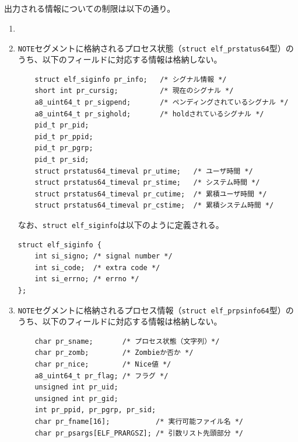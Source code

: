 \documentclass[twoside,11pt,fleqn]{book}
\begin{document}

\subsection{}
出力される情報についての制限は以下の通り。
\begin{enumerate}
\item {}
\item \texttt{NOTE}セグメントに格納されるプロセス状態（\texttt{struct elf\_prstatus64}型）のうち、以下のフィールドに対応する情報は格納しない。
\begin{verbatim}
    struct elf_siginfo pr_info;   /* シグナル情報 */
    short int pr_cursig;          /* 現在のシグナル */
    a8_uint64_t pr_sigpend;       /* ペンディングされているシグナル */
    a8_uint64_t pr_sighold;       /* holdされているシグナル */
    pid_t pr_pid;                 
    pid_t pr_ppid;                
    pid_t pr_pgrp;                
    pid_t pr_sid;                 
    struct prstatus64_timeval pr_utime;   /* ユーザ時間 */
    struct prstatus64_timeval pr_stime;   /* システム時間 */
    struct prstatus64_timeval pr_cutime;  /* 累積ユーザ時間 */
    struct prstatus64_timeval pr_cstime;  /* 累積システム時間 */
\end{verbatim}
なお、\texttt{struct elf\_siginfo}は以下のように定義される。
\begin{verbatim}
struct elf_siginfo {
    int si_signo; /* signal number */
    int si_code;  /* extra code */
    int si_errno; /* errno */
};
\end{verbatim}
\item \texttt{NOTE}セグメントに格納されるプロセス情報（\texttt{struct elf\_prpsinfo64}型）のうち、以下のフィールドに対応する情報は格納しない。
\begin{verbatim}
    char pr_sname;       /* プロセス状態（文字列）*/
    char pr_zomb;        /* Zombieか否か */
    char pr_nice;        /* Nice値 */
    a8_uint64_t pr_flag; /* フラグ */
    unsigned int pr_uid;
    unsigned int pr_gid;
    int pr_ppid, pr_pgrp, pr_sid;
    char pr_fname[16];           /* 実行可能ファイル名 */
    char pr_psargs[ELF_PRARGSZ]; /* 引数リスト先頭部分 */
\end{verbatim}
\end{enumerate}
\end{document}
